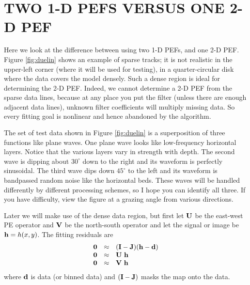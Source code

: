 \section{TWO 1-D PEFS VERSUS ONE 2-D PEF}

Here we look at the difference between using two 1-D PEFs,
and one 2-D PEF.
Figure \ref{fig:duelin} shows an example of sparse tracks;
it is not realistic
in the upper-left corner
(where it will be used for testing),
in a quarter-circular disk where
the data covers the model densely.
Such a dense region is ideal for determining the 2-D PEF.
Indeed, we cannot
determine a 2-D PEF from the sparse data lines,
because at any place you put the filter
(unless there are enough adjacent data lines),
unknown filter coefficients will multiply missing data.
So every fitting goal is nonlinear
and hence abandoned by the algorithm.

\par
The set of test data shown in Figure \ref{fig:duelin}
is a superposition of three functions like plane waves.
One plane wave looks like low-frequency horizontal layers.
Notice that the various layers vary in strength with depth.
The second wave is dipping about $30^\circ$ down to the right
and its waveform is perfectly sinusoidal.
The third wave dips down $45^\circ$ to the left
and its waveform is bandpassed random noise like the horizontal beds.
These waves will be handled differently by different processing schemes,
so I hope you can identify all three.
If you have difficulty,
view the figure at a grazing angle from various directions.

\par
Later we will make use of the dense data region,
but first let $\bold U$ be the east-west PE operator
and $\bold V$ be the north-south operator
and let the signal or image be $\bold h = h(x,y)$.
The fitting residuals are
\begin{equation}
        \begin{array}{lll}
        \bold 0 &\approx& (\bold I - \bold J) (\bold h - \bold d) \\
        \bold 0 &\approx&  \bold U \ \bold h  \\
        \bold 0 &\approx&  \bold V \ \bold h
        \end{array}
        \label{eqn:maskregression}
\end{equation}
where $\bold d$ is data (or binned data) and $(\bold I-\bold J)$
masks the map onto the data.

